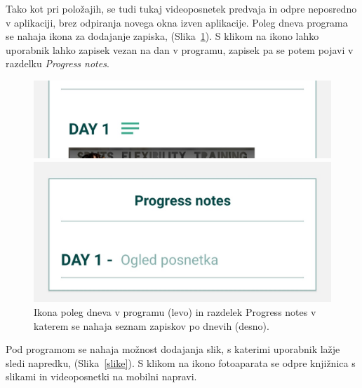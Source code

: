 \documentclass[a4paper, 12pt]{book}
\begin{document}
Tako kot pri položajih, se tudi tukaj videoposnetek predvaja in odpre neposredno v aplikaciji, brez odpiranja novega okna izven aplikacije. Poleg dneva programa se nahaja ikona za dodajanje zapiska, (Slika~\ref{ikonanotes}). S klikom na ikono lahko uporabnik lahko zapisek vezan na dan v programu, zapisek pa se potem pojavi v razdelku \textit{Progress notes}.

\begin{figure}[htbp]
\centering
  \begin{minipage}[b]{0.55\textwidth}
    \includegraphics[width=\textwidth]{ikonanotes.jpg}\centering
  \end{minipage}
  \begin{minipage}[b]{0.42\textwidth}
    \includegraphics[width=\textwidth]{fullnotes.jpg}\centering
  \end{minipage}
    \caption{Ikona poleg dneva v programu (levo) in razdelek Progress notes v katerem se nahaja seznam zapiskov po dnevih (desno). \\ }
    \label{ikonanotes}
\end{figure}

Pod programom se nahaja možnost dodajanja slik, s katerimi uporabnik lažje sledi napredku, (Slika~\ref{slike}). S klikom na ikono fotoaparata se odpre knjižnica s slikami in videoposnetki na mobilni napravi. 
\end{document}
